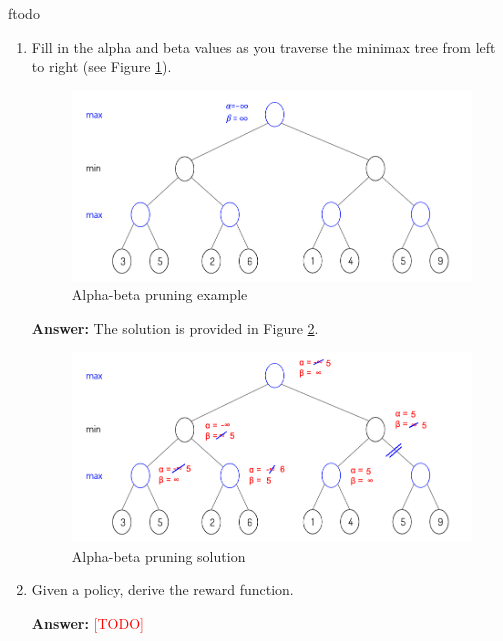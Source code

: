 ƒtodo\documentclass{article}
\newenvironment{QandA}{\begin{enumerate}[label=\arabic*.]}{\end{enumerate}}
\newenvironment{answer}{\par\normalfont \textbf{Answer:}}{}
\newcommand{\todo}{\textcolor{red}{[TODO]}}
\begin{document}
\begin{QandA}
    \item Fill in the alpha and beta values as you traverse the minimax tree from left to right (see Figure \ref{fig:alpha-beta}).
    \begin{figure}[h!]
        \centering
        \includegraphics[width=0.7\columnwidth]{img/alpha-beta.png}
        \caption{Alpha-beta pruning example}
        \label{fig:alpha-beta}
    \end{figure}

    \begin{answer}
        The solution is provided in Figure \ref{fig:alpha-beta-sol}.
    \end{answer}

    \begin{figure}[h!]
        \centering
        \includegraphics[width=0.7\columnwidth]{img/alpha-beta-sol.png}
        \caption{Alpha-beta pruning solution}
        \label{fig:alpha-beta-sol}
    \end{figure}

    \item Given a policy, derive the reward function.
    \begin{answer}
        \todo
    \end{answer}


\end{QandA}
\end{document}

